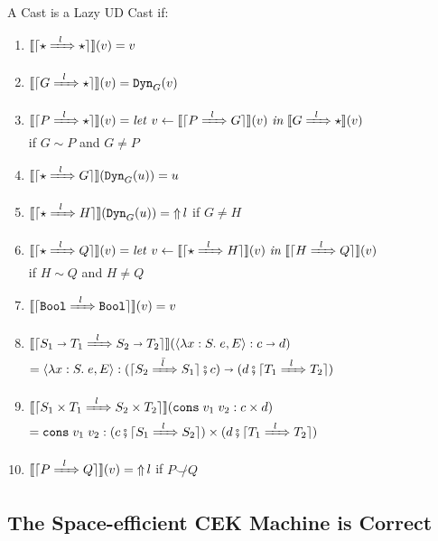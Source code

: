 \documentclass[runningheads]{llncs}
\newcommand{\error}[1]{\ensuremath{\mathop{\Uparrow}#1}}
\newcommand{\Tdyn}[0]{\ensuremath{\star}}
\newcommand{\Pbool}[0]{\ensuremath{\mathtt{Bool}}}
\newcommand{\Pfunc}[2]{\ensuremath{#1 \shortrightarrow #2}}
\newcommand{\Pprod}[2]{\ensuremath{#1 \times #2}}
\newcommand{\elam}[3]{\lambda#1:#2.\;#3}
\newcommand{\econs}[2]{\mathtt{cons} \; #1 \; #2}
\newcommand{\ecast}[2]{\ensuremath{#1 : #2}}
\newcommand{\ccast}[3]{#1 \xRightarrow[]{\enskip #2 \enskip} #3}
\newcommand{\vdyn}[2]{\mathtt{Dyn}_{#1}(#2)}
\newcommand{\vfunc}[4]{\langle\elam{#1}{#2}{#3},#4\rangle}
\newcommand{\vcons}[2]{\econs{#1}{#2}}
\newcommand{\mlet}[3]{\ensuremath{
\mathit{let}\ {#1\leftarrow#2}\ \mathit{in}\;#3}}
\newcommand{\denote}[1]{\ensuremath{\llbracket #1 \rrbracket}}
\newcommand{\compose}[2]{\ensuremath{#1 \fatsemi #2}}
\newcommand{\translate}[1]{\ensuremath{\lceil#1\rceil}}
\newcommand{\notshallowlyconsistent}[2]{\ensuremath{#1\not\smile#2}}
\begin{document}
\begin{definition}
	\label{def:LazyUD-CastADT}
	A Cast is a Lazy UD Cast if:
	\begin{enumerate}
	\item $\denote{\translate{\ccast{\Tdyn}{l}{\Tdyn}}}(v) = v$
	\item $\denote{\translate{\ccast{G}{l}{\Tdyn}}}(v) = \vdyn{G}{v}$
	\item $\denote{\translate{\ccast{P}{l}{\Tdyn}}}(v) = 
	    \mlet{v}{\denote{\translate{\ccast{P}{l}{G}}}(v)}{\denote{\ccast{G}{l}{\Tdyn}}(v)}
        $\\
		if $G \sim P$ and $G \neq P$	
	\item $\denote{\translate{\ccast{\Tdyn}{l}{G}}}(\vdyn{G}{u}) = u$
	\item $\denote{\translate{\ccast{\Tdyn}{l}{H}}}(\vdyn{G}{u}) = \error{l}$ \qquad
		if $G \neq H$
	\item $\denote{\translate{\ccast{\Tdyn}{l}{Q}}}(v) = 
	    \mlet{v}{\denote{\translate{\ccast{\Tdyn}{l}{H}}}(v)}{\denote{\translate{\ccast{H}{l}{Q}}}(v)}
		$\\
		if $H \sim Q$ and $H \neq Q$
	\item $\denote{\translate{\ccast{\Pbool}{l}{\Pbool}}}(v) = v$
		\item 
		$\denote{\translate{\ccast{\Pfunc{S_1}{T_1}}{l}{\Pfunc{S_2}{T_2}}}}(
		\ecast{\vfunc{x}{S}{e}{E}}{\Pfunc{c}{d}})$\\
		$=
		\ecast{\vfunc{x}{S}{e}{E}}{
			\Pfunc{
				(\compose{\translate{\ccast{S_2}{\bar{l}}{S_1}}}{c})}{
				(\compose{d}{\translate{\ccast{T_1}{l}{T_2}}})}}$
		\item 
		$\denote{\translate{\ccast{\Pprod{S_1}{T_1}}{l}{\Pprod{S_2}{T_2}}}}(
		\ecast{\vcons{v_1}{v_2}}{\Pprod{c}{d}})$\\
		$=
		\ecast{\vcons{v_1}{v_2}}{
			\Pprod{
				(\compose{c}{\translate{\ccast{S_1}{l}{S_2}}})}{
				(\compose{d}{\translate{\ccast{T_1}{l}{T_2}}})}}$
		\item $\denote{\translate{\ccast{P}{l}{Q}}}(v) = \error{l}$\qquad
			if $\notshallowlyconsistent{P}{Q}$
	\end{enumerate}
\end{definition}

\subsection{The Space-efficient CEK Machine is Correct}
\label{sec:S-correct}
\end{document}
